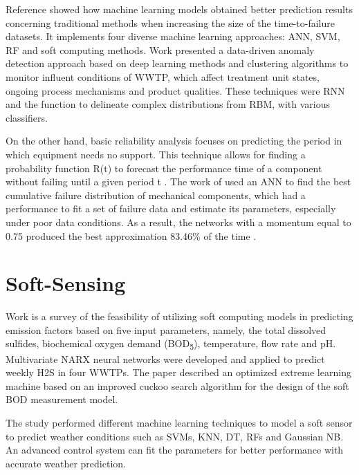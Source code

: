  Reference \cite{Alsina2018} showed how machine learning models obtained better prediction results concerning traditional methods when increasing the size of the time-to-failure datasets. It implements four diverse machine learning approaches: \ac{ANN}, \ac{SVM}, \ac{RF} and soft computing methods. Work \cite{Dairi2019} presented a data-driven anomaly detection approach based on deep learning methods and clustering algorithms to monitor influent conditions of \ac{WWTP}, which affect treatment unit states, ongoing process mechanisms and product qualities. These techniques were \ac{RNN} and the function to delineate complex distributions from \ac{RBM}, with various classifiers.
 
 On the other hand, basic reliability analysis focuses on predicting the period in which equipment needs no support. This technique allows for finding a probability function R(t) to forecast the performance time of a component without failing until a given period t \cite{Alsina2018}. The work of \cite{Alsina2016} used an \ac{ANN} to find the best cumulative failure distribution of mechanical components, which had a performance to fit a set of failure data and estimate its parameters, especially under poor data conditions. As a result, the networks with a momentum equal to 0.75 produced the best approximation 83.46\% of the time \cite{Alsina2016}.

\section{Soft-Sensing}
\label{s:Related-Works-SoftSensing}

Work \cite{Zounemat-Kermani2019} is a survey of the feasibility of utilizing soft computing models in predicting emission factors based on five input parameters, namely, the total dissolved sulfides, biochemical oxygen demand (\ac{BOD}\textsubscript{5}), temperature, flow rate and pH. Multivariate \ac{NARX} neural networks were developed and applied to predict weekly H2S in four \ac{WWTP}s. The paper \cite{Yu2019} described an optimized extreme learning machine based on an improved cuckoo search algorithm for the design of the soft \ac{BOD} measurement model.

The study \cite{Hernandez-del-Olmo2019} performed different machine learning techniques to model a soft sensor to predict weather conditions such as \ac{SVM}s, \ac{KNN}, \ac{DT}, \ac{RF}s and Gaussian \ac{NB}. An advanced control system can fit the parameters for better performance with accurate weather prediction.

